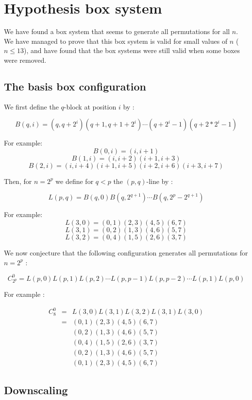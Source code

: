 \documentclass[11pt, a4paper]{article}
\begin{document}
\section{Hypothesis box system}

We have found a box system that seems to generate all permutations for all $n$.
We have managed to prove that this box system is valid for small values of $n$
($n \leq 13$), and have found that the box systems were still valid when some
boxes were removed.

\subsection{The basis box configuration}

We first define the $q$-block at position $i$ by :

$$B(q,i) = (q,q+2^i)(q+1,q+1+2^i)\cdots(q+2^i-1)(q+2*2^i-1)$$

For example: 
$$B(0,i) = (i,i+1)$$
$$B(1,i) = (i, i+2)(i+1, i+3)$$
$$B(2, i) = (i,i+4)(i+1,i+5)(i+2,i+6)(i+3,i+7)$$

Then, for $n=2^p$ we define for $q < p$ the $(p,q)$-line by :

$$L(p,q) = B(q,0) B(q,2^{q+1}) \cdots B(q,2^p-2^{q+1})$$

For example:
$$L(3,0) = (0,1)(2,3)(4,5)(6,7)$$
$$L(3,1) = (0,2)(1,3)(4,6)(5,7)$$
$$L(3,2) = (0,4)(1,5)(2,6)(3,7)$$

We now conjecture that the following configuration generates all permutations
for $n=2^p$ :

$$C_{2^p}^0 = L(p,0) L(p,1) L(p,2) \cdots L(p,p-1) L(p,p-2) \cdots L(p,1) L(p,0)$$

For example :

$$
\begin{aligned}
    C_8^0 & = & L(3,0) L(3,1) L(3,2) L(3,1) L(3,0) \\
        & = & (0,1)(2,3)(4,5)(6,7) \\
        & & (0,2)(1,3)(4,6)(5,7) \\
        & & (0,4)(1,5)(2,6)(3,7) \\
        & & (0,2)(1,3)(4,6)(5,7) \\
        & & (0,1)(2,3)(4,5)(6,7)
\end{aligned}$$

\subsection{Downscaling}
\end{document}
